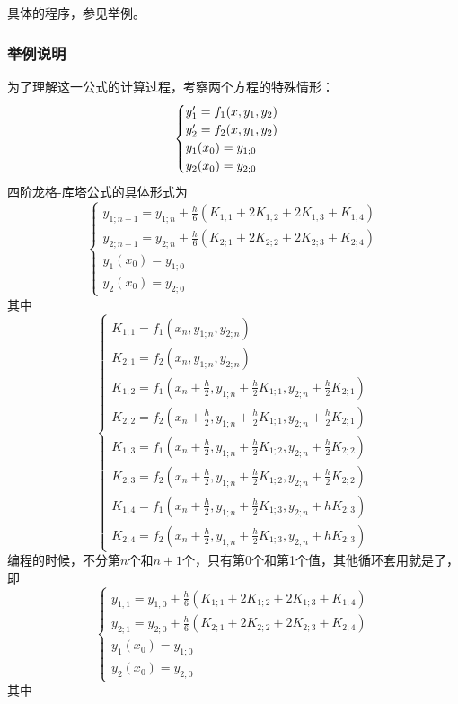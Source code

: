 具体的程序，参见举例。



\subsubsection{举例说明}
为了理解这一公式的计算过程，考察两个方程的特殊情形：
$$\begin{cases}
y_1\rq{}=f_1(x,y_1,y_2)\\
y_2\rq{}=f_2(x,y_1,y_2)\\
y_1(x_0)=y_{1;0}\\
y_2(x_0)=y_{2;0}
\end{cases}$$
四阶龙格-库塔公式的具体形式为
$$\begin{cases}
y_{1;n+1}=y_{1;n}+\frac{h}{6}(K_{1;1}+2K_{1;2}+2K_{1;3}+K_{1;4})\\
y_{2;n+1}=y_{2;n}+\frac{h}{6}(K_{2;1}+2K_{2;2}+2K_{2;3}+K_{2;4})\\
y_1(x_0)=y_{1;0}\\
y_2(x_0)=y_{2;0}
\end{cases}$$
其中
$$\begin{cases}
K_{1;1}=f_1(x_n,y_{1;n},y_{2;n})\\
K_{2;1}=f_2(x_n,y_{1;n},y_{2;n})\\
K_{1;2}=f_1(x_n+\frac{h}{2},y_{1;n}+\frac{h}{2}K_{1;1},y_{2;n}+\frac{h}{2}K_{2;1})\\
K_{2;2}=f_2(x_n+\frac{h}{2},y_{1;n}+\frac{h}{2}K_{1;1},y_{2;n}+\frac{h}{2}K_{2;1})\\
K_{1;3}=f_1(x_n+\frac{h}{2},y_{1;n}+\frac{h}{2}K_{1;2},y_{2;n}+\frac{h}{2}K_{2;2})\\
K_{2;3}=f_2(x_n+\frac{h}{2},y_{1;n}+\frac{h}{2}K_{1;2},y_{2;n}+\frac{h}{2}K_{2;2})\\
K_{1;4}=f_1(x_n+\frac{h}{2},y_{1;n}+\frac{h}{2}K_{1;3},y_{2;n}+hK_{2;3})\\
K_{2;4}=f_2(x_n+\frac{h}{2},y_{1;n}+\frac{h}{2}K_{1;3},y_{2;n}+hK_{2;3})
\end{cases}$$
编程的时候，不分第$n$个和$n+1$个，只有第0个和第1个值，其他循环套用就是了，即
$$\begin{cases}
y_{1;1}=y_{1;0}+\frac{h}{6}(K_{1;1}+2K_{1;2}+2K_{1;3}+K_{1;4})\\
y_{2;1}=y_{2;0}+\frac{h}{6}(K_{2;1}+2K_{2;2}+2K_{2;3}+K_{2;4})\\
y_1(x_0)=y_{1;0}\\
y_2(x_0)=y_{2;0}
\end{cases}$$
其中
